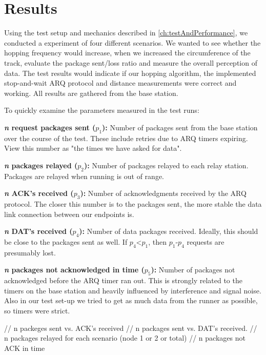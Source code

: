 \chapter{Results}\label{ch:results}

Using the test setup and mechanics described in \ref{ch:testAndPerformance}, we conducted a experiment of four different scenarios. We wanted to see whether the hopping frequency would increase, when we increased the circumference of the track, evaluate the package sent/loss ratio and measure the overall perception of data. The test results would indicate if our hopping algorithm, the implemented stop-and-wait ARQ protocol and distance measurements were correct and working. All results are gathered from the base station.

\noindent To quickly examine the parameters measured in the test runs:

\noindent \textbf{\textit{n} request packages sent ($p_1$):} Number of packages sent from the base station over the course of the test. These include retries due to ARQ timers expiring. View this number as "the times we have asked for data".

\noindent \textbf{\textit{n} packages relayed ($p_2$):} Number of packages relayed to each relay station. Packages are relayed when running is out of range.

\noindent \textbf{\textit{n} ACK's received ($p_3$):} Number of acknowledgments received by the ARQ protocol. The closer this number is to the packages sent, the more stable the data link connection between our endpoints is.

\noindent \textbf{\textit{n} DAT's received ($p_4$):} Number of data packages received. Ideally, this should be close to the packages sent as well. If $p_4$<$p_1$, then $p_1$-$p_4$ requests are presumably lost.

\noindent \textbf{\textit{n} packages not acknowledged in time ($p_5$):} Number of packages not acknowledged before the ARQ timer ran out. This is strongly related to the timers on the base station and heavily influenced by interference and signal noise. Also in our test set-up we tried to get as much data from the runner as possible, so timers were strict.




// n packeges sent vs. ACK's received
// n packages sent vs. DAT's received.
// n packages relayed for each scenario (node 1 or 2 or total)
// n packages not ACK in time